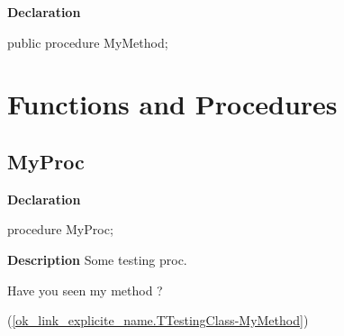 \documentclass{report}
\newif\ifpdf
\begin{document}
\label{ok_link_explicite_name.TTestingClass-MyMethod}
\begin{list}{}{
\setlength{\itemindent}{0cm}
\setlength{\listparindent}{0cm}
\setlength{\leftmargin}{\evensidemargin}
\addtolength{\leftmargin}{\tmplength}
\settowidth{\labelsep}{X}
\addtolength{\leftmargin}{\labelsep}
\setlength{\labelwidth}{\tmplength}
}
\item[\textbf{Declaration}\hfill]
\ifpdf
\begin{flushleft}
\fi
\begin{ttfamily}
public procedure MyMethod;\end{ttfamily}

\ifpdf
\end{flushleft}
\fi

\end{list}
\section{Functions and Procedures}
\ifpdf
\subsection*{\large{\textbf{MyProc}}\normalsize\hspace{1ex}\hrulefill}
\else
\subsection*{MyProc}
\fi
\label{ok_link_explicite_name-MyProc}
\begin{list}{}{
\setlength{\itemindent}{0cm}
\setlength{\listparindent}{0cm}
\setlength{\leftmargin}{\evensidemargin}
\addtolength{\leftmargin}{\tmplength}
\settowidth{\labelsep}{X}
\addtolength{\leftmargin}{\labelsep}
\setlength{\labelwidth}{\tmplength}
}
\item[\textbf{Declaration}\hfill]
\ifpdf
\begin{flushleft}
\fi
\begin{ttfamily}
procedure MyProc;\end{ttfamily}

\ifpdf
\end{flushleft}
\fi

\par
\item[\textbf{Description}]
Some testing proc. \begin{ttfamily}Have you seen my method ?\end{ttfamily}(\ref{ok_link_explicite_name.TTestingClass-MyMethod})

\end{list}
\end{document}
